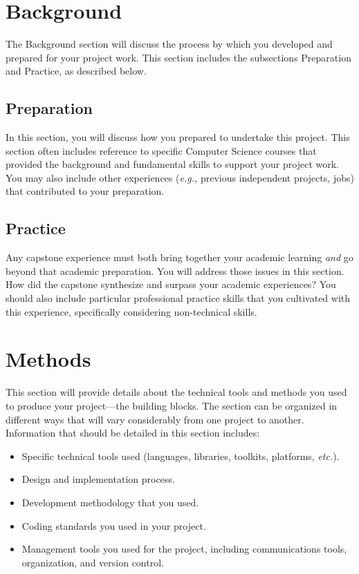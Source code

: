 \documentclass[titlepage]{article}
\begin{document}
\section{Background}
The Background section will discuss the process by which you developed and prepared for your project work. This section includes the subsections Preparation and Practice, as described below.

\subsection{Preparation}
In this section, you will discuss how you prepared to undertake this project. This section often includes reference to specific Computer Science courses that provided the background and fundamental skills to support your project work. You may also include other experiences (\textit{e.g.,} previous independent projects, jobs) that contributed to your preparation.

\subsection{Practice}
Any capstone experience must both bring together your academic learning \textit{and} go beyond that academic preparation. You will address those issues in this section. How did the capstone synthesize and surpass your academic experiences? You should also include particular professional practice skills that you cultivated with this experience, specifically considering non-technical skills.

\section{Methods}
This section will provide details about the technical tools and methods you used to produce your project---the building blocks. The section can be organized in different ways that will vary considerably from one project to another. Information that should be detailed in this section includes:
\begin{itemize}
\item Specific technical tools used (languages, libraries, toolkits, platforms, \textit{etc.}).
\item Design and implementation process.
\item Development methodology that you used.
\item Coding standards you used in your project.
\item Management tools you used for the project, including communications tools, organization, and version control.
\end{itemize}
\end{document}
